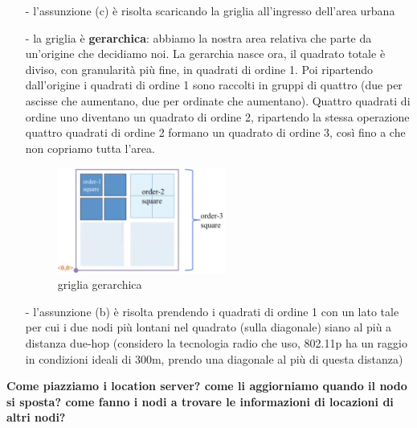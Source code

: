 \documentclass[12pt,italian]{report}
\begin{document}
\begin{itemize}
    \item [-] l'assunzione (c) è risolta scaricando la griglia all'ingresso dell'area urbana
    \item [-] la griglia è \textbf{gerarchica}: abbiamo la nostra area relativa che parte da un'origine che decidiamo noi. La gerarchia nasce ora, il quadrato totale è diviso, con granularità più fine, in quadrati di ordine 1. Poi ripartendo dall'origine i quadrati di ordine 1 sono raccolti in gruppi di quattro (due per ascisse che aumentano, due per ordinate che aumentano). Quattro quadrati di ordine uno diventano un quadrato di ordine 2, ripartendo la stessa operazione quattro quadrati di ordine 2 formano un quadrato di ordine 3, così fino a che non copriamo tutta l'area.
    \begin{figure}[h]
    \centering
    \includegraphics[width=55mm]{img/gergrid.PNG}
    \caption{griglia gerarchica}
    \label{fig:home}
    \end{figure}

    \item [-] l'assunzione (b) è risolta prendendo i quadrati di ordine 1 con un lato tale per cui i due nodi più lontani nel quadrato (sulla diagonale) siano al più a distanza due-hop (considero la tecnologia radio che uso, 802.11p ha un raggio in condizioni ideali di 300m, prendo una diagonale al più di questa distanza) 
\end{itemize}

\noindent \textbf{Come piazziamo i location server? come li aggiorniamo quando il nodo si sposta? come fanno i nodi a trovare le informazioni di locazioni di altri nodi?} 
\end{document}
